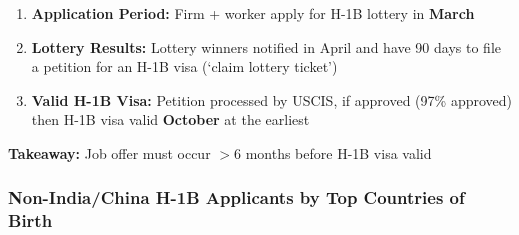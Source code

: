 \documentclass[xcolor=dvipsnames, compress, 12pt, aspectratio=169, handout]{beamer}
\begin{document}
\begin{frame}

    \begin{enumerate}
        \item \textcolor{litecolor}{\textbf{Application Period:}} Firm + worker apply for H-1B lottery in \textbf{March} 
        \vspace{2mm}
        \item \textcolor{maincolor}{\textbf{Lottery Results:}} Lottery winners notified in April and have 90 days to file a petition for an H-1B visa (`claim lottery ticket')
        \vspace{2mm}
        \item \textcolor{darkcolor}{\textbf{Valid H-1B Visa:}} Petition processed by USCIS, if approved (97\% approved) then H-1B visa valid \textbf{October} at the earliest
    \end{enumerate}
    \vspace{3mm}
    \textbf{Takeaway:} Job offer must occur $>6$ months before H-1B visa valid

\end{frame}

\begin{frame}\label{h1b_apps_cob}
    \frametitle{Non-India/China H-1B Applicants by Top Countries of Birth \hyperlink{h1b_apps_summ}{}}
    \begin{table}[ht]
        \centering
        \end{table}
\end{frame}
    
\end{document}
